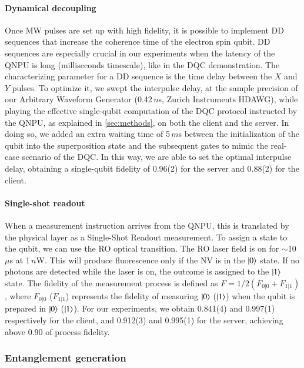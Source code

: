 \paragraph{Dynamical decoupling}

Once \ac{MW} pulses are set up with high fidelity, it is possible to implement \ac{DD} sequences that increase the coherence time of the electron spin qubit. \ac{DD} sequences are especially crucial in our experiments when the latency of the \ac{QNPU} is long (milliseconds timescale), like in the \ac{DQC} demonstration. The characterizing parameter for a \ac{DD} sequence is the time delay between the $X$ and $Y$ pulses. To optimize it, we swept the interpulse delay, at the sample precision of our Arbitrary Waveform Generator (0.42\,$n$s, Zurich Instruments HDAWG), while playing the effective single-qubit computation of the \ac{DQC} protocol instructed by the \ac{QNPU}, as explained in \cref{sec:methods}, on both the client and the server. In doing so, we added an extra waiting time of 5\,$m$s between the initialization of the qubit into the superposition state and the subsequent gates to mimic the real-case scenario of the \ac{DQC}. In this way, we are able to set the optimal interpulse delay, obtaining a single-qubit fidelity of 0.96(2) for the server and 0.88(2) for the client.

\paragraph{Single-shot readout}

When a measurement instruction arrives from the \ac{QNPU}, this is translated by the physical layer as a Single-Shot Readout measurement. To assign a state to the qubit, we can use the \ac{RO} optical transition. The \ac{RO} laser field is on for $\sim$10\,$\mu$s at 1\,$n$W. This will produce fluorescence only if the \ac{NV} is in the $\ket{0}$ state. If no photons are detected while the laser is on, the outcome is assigned to the $\ket{1}$ state. The fidelity of the measurement process is defined as $F=1/2(F_{0|0}+F_{1|1})$, where $F_{0|0}$ ($F_{1|1}$) represents the fidelity of measuring $\ket{0}$ ($\ket{1}$) when the qubit is prepared in $\ket{0}$ ($\ket{1}$). For our experiments, we obtain 0.841(4) and 0.997(1) respectively for the client, and 0.912(3) and 0.995(1) for the server, achieving above 0.90 of process fidelity.

\subsubsection{Entanglement generation}
\label{sec:NVentanglement}

